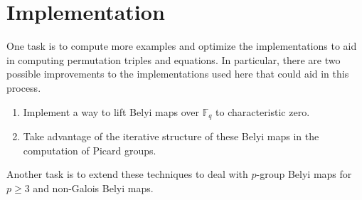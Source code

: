 \documentclass{dcthesis}
\newcommand{\FF}{\mathbb{F}}
\numberwithin{equation}{section}
\theoremstyle{definition}
\theoremstyle{remark}
\begin{document}
{{{  \section{Implementation}{\label{sec:futureimplementation}
    One task is to compute more examples
    and optimize the implementations to
    aid in computing permutation triples
    and equations.
    In particular, there are two possible improvements
    to the implementations used here
    that could aid in this process.
    \begin{enumerate}
      \item
        Implement a way to lift Belyi maps
        over $\FF_q$ to characteristic zero.
      \item
        Take advantage of the iterative structure
        of these Belyi maps in the computation
        of Picard groups.
    \end{enumerate}
    Another task is to extend these
    techniques to deal with $p$-group Belyi maps
    for $p\geq 3$
    and non-Galois Belyi maps.
  }
}}}
\end{document}
